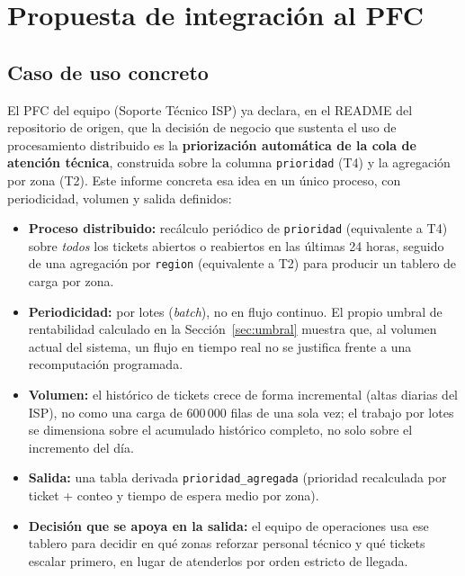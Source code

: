 \documentclass[11pt,a4paper]{article}
\begin{document}
\section{Propuesta de integración al PFC}
\label{sec:integracion}

\subsection{Caso de uso concreto}

El PFC del equipo (Soporte Técnico ISP) ya declara, en el README del repositorio de origen, que
la decisión de negocio que sustenta el uso de procesamiento distribuido es la
\textbf{priorización automática de la cola de atención técnica}, construida sobre la columna
\texttt{prioridad} (T4) y la agregación por zona (T2). Este informe concreta esa idea en un
único proceso, con periodicidad, volumen y salida definidos:

\begin{itemize}
\item \textbf{Proceso distribuido:} recálculo periódico de \texttt{prioridad} (equivalente a T4)
sobre \emph{todos} los tickets abiertos o reabiertos en las últimas 24 horas, seguido de una
agregación por \texttt{region} (equivalente a T2) para producir un tablero de carga por zona.
\item \textbf{Periodicidad:} por lotes (\emph{batch}), no en flujo continuo. El propio umbral de
rentabilidad calculado en la Sección~\ref{sec:umbral} muestra que, al volumen actual del
sistema, un flujo en tiempo real no se justifica frente a una recomputación programada.
\item \textbf{Volumen:} el histórico de tickets crece de forma incremental (altas diarias del
ISP), no como una carga de 600\,000 filas de una sola vez; el trabajo por lotes se dimensiona
sobre el acumulado histórico completo, no solo sobre el incremento del día.
\item \textbf{Salida:} una tabla derivada \texttt{prioridad\_agregada} (prioridad recalculada por
ticket + conteo y tiempo de espera medio por zona).
\item \textbf{Decisión que se apoya en la salida:} el equipo de operaciones usa ese tablero para
decidir en qué zonas reforzar personal técnico y qué tickets escalar primero, en lugar de
atenderlos por orden estricto de llegada.
\end{itemize}
\end{document}
